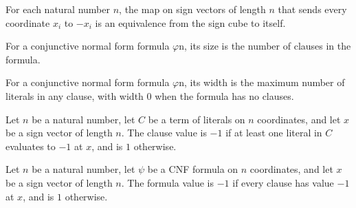 \begin{definition}
\label{FABL.signCubeNegEquiv}
\leanok
For each natural number $n$, the map on sign vectors of length $n$ that sends every
coordinate $x_i$ to $-x_i$ is an equivalence from the sign cube to itself.
\end{definition}

\begin{definition}
\label{FABL.CNFFormula.size}
\leanok
{}
For a conjunctive normal form formula $\varphi$n, its size is the number of clauses in the
formula.
\end{definition}

\begin{definition}
\label{FABL.CNFFormula.width}
\leanok
{}
For a conjunctive normal form formula $\varphi$n, its width is the maximum number of literals
in any clause, with width $0$ when the formula has no clauses.
\end{definition}

\begin{definition}
\label{FABL.CNFFormula.clauseEval}
\leanok
{}
Let $n$ be a natural number, let $C$ be a term of literals on $n$ coordinates, and let
$x$ be a sign vector of length $n$. The clause value is $-1$ if at least one literal in
$C$ evaluates to $-1$ at $x$, and is $1$ otherwise.
\end{definition}

\begin{definition}
\label{FABL.CNFFormula.eval}
\leanok
{}
Let $n$ be a natural number, let $\psi$ be a CNF formula on $n$ coordinates, and let $x$
be a sign vector of length $n$. The formula value is $-1$ if every clause has value $-1$
at $x$, and is $1$ otherwise.
\end{definition}

